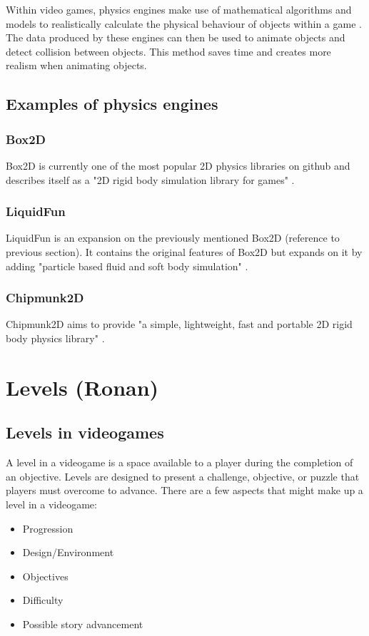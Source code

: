 \documentclass{article} %
\begin{document}
Within video games, physics engines make use of mathematical algorithms and models to realistically calculate the physical behaviour of objects within a game \cite{Ipacs_2023}. The data produced by these engines can then be used to animate objects and detect collision between objects. This method saves time and creates more realism when animating objects.

\subsection{Examples of physics engines}

\subsubsection{Box2D}

Box2D is currently one of the most popular 2D physics libraries on github and describes itself as a "2D rigid body simulation library for games" \cite{Catto_2024}.

\subsubsection{LiquidFun}

LiquidFun is an expansion on the previously mentioned Box2D (reference to previous section). It contains the original features of Box2D but expands on it by adding "particle based fluid and soft body simulation" \cite{Miles_2014}.

\subsubsection{Chipmunk2D}

Chipmunk2D aims to provide "a simple, lightweight, fast and portable 2D rigid body physics library" \cite{Slembcke_2023}.

\newpage

\section{Levels (Ronan)}
\subsection{Levels in videogames}
A level in a videogame is a space available to a player during 
the completion of an objective. Levels are designed to present a challenge, 
objective, or puzzle that players must overcome to advance. 
There are a few aspects that might make up a level in a videogame:
\begin{itemize}
	\item Progression
	\item Design/Environment
	\item Objectives
	\item Difficulty
	\item Possible story advancement
\end{itemize}
\end{document}
